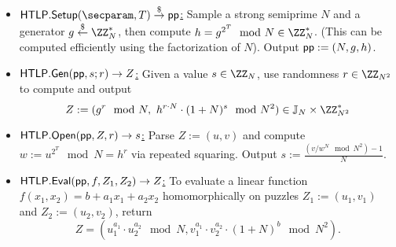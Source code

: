     \begin{construction}\label{con:paillierHTLP}
    \hfill
    \begin{itemize}
        \item \underline{$\htlp.\Setup(\secparam, \Ttime) \randout \pp$:} Sample a strong semiprime $N$ and a generator $g \sample \ZZ_N^*$, then compute $h = g^{2^\Ttime} \mod{N} \in \ZZ_N^*$. (This can be computed efficiently using the factorization of $N$). Output $\mathsf{pp} := (N, g, h)$.
        \item \underline{$\mathsf{HTLP}.{\sf Gen}(\mathsf{pp}, s; r) \rightarrow Z$:} Given a value $s \in \ZZ_N$, use randomness $r \in \ZZ_{N^2}$ to compute and output
            $$Z := (g^r \mod{N},\ h^{r \cdot N} \cdot (1+N)^s \mod{N^2}) \in \JJ_N \times \ZZ_{N^2}^*$$
        \item \underline{$\mathsf{HTLP}.\mathsf{Open}(\mathsf{pp}, Z, r) \rightarrow s$:} Parse $Z := (u,v)$ and compute $w := u^{2^T} \mod{N} \allowbreak= h^r$ via repeated squaring. Output $s := \frac{(v/w^N \mod{N^2})- 1}{N}$.
        \item \underline{$\mathsf{HTLP}.{\sf Eval}(\mathsf{pp}, f, Z_1, Z_2) \rightarrow Z$:} To evaluate a linear function $f(x_1, x_2) = b + a_1 x_1 + a_2 x_2$ homomorphically on puzzles $Z_1 := (u_1, v_1)$ and $Z_2 := (u_2, v_2)$, return
        $$Z = (u_1^{a_1} \cdot u_2^{a_2} \mod{N}, v_1^{a_1} \cdot v_2^{a_2} \cdot (1+N)^b \mod{N^2}).$$
    \end{itemize}
    \end{construction}


